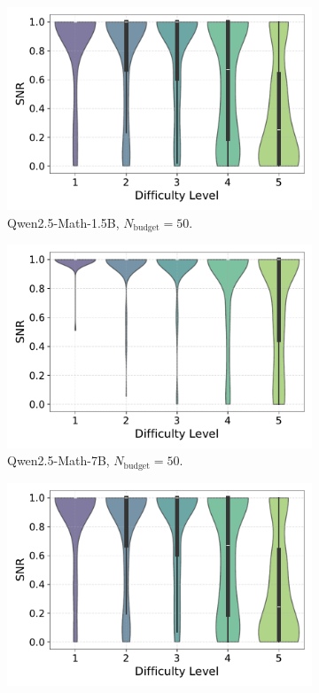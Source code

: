 \begin{figure}[h!]
\begin{subfigure}{0.49\textwidth}
      \includegraphics[width=\textwidth]{figs/QWEN-MATH-1.5B_violin_maj50_SNR_01.pdf}
        \caption{Qwen2.5-Math-1.5B, $N_{\text{budget}}=50$.}
      \label{fig:QWEN-MATH-1.5B_budget_50_SNR_01}
  \end{subfigure}
  \hfill
  \begin{subfigure}{0.49\textwidth}
      \centering
      \includegraphics[width=\textwidth]{figs/QWEN-MATH-7B_violin_maj50_SNR_01.pdf}
        \caption{Qwen2.5-Math-7B, $N_{\text{budget}}=50$.}
      \label{fig:QWEN-MATH-7B_budget_50_SNR_01}
  \end{subfigure}
  \vfill
  \begin{subfigure}{0.49\textwidth}
      \centering
      \includegraphics[width=\textwidth]{figs/QWEN-MATH-1.5B_violin_maj100_SNR_01.pdf}

\end{subfigure}
\end{figure}
